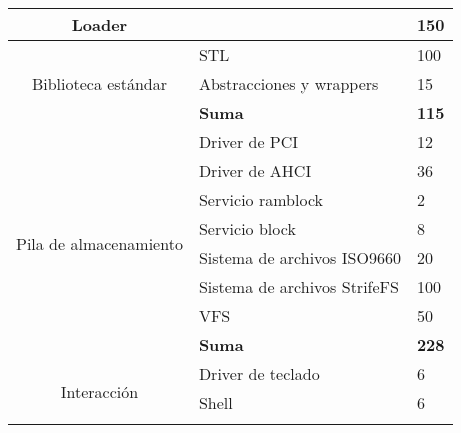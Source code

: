 \begin{table}[]
\begin{tabular}{|c|l|l|}
Loader                                  &                                                 & \textbf{150}                                  \\ \hline
\multirow{3}{*}{Biblioteca estándar}    & STL                                             & 100                                           \\ \cline{2-3} 
                                        & Abstracciones y wrappers                        & 15                                            \\ \cline{2-3} 
                                        & \textbf{Suma}                                   & \textbf{115}                                  \\ \hline
\multirow{8}{*}{Pila de almacenamiento} & Driver de PCI                                   & 12                                            \\ \cline{2-3} 
                                        & Driver de AHCI                                  & 36                                            \\ \cline{2-3} 
                                        & Servicio ramblock                               & 2                                             \\ \cline{2-3} 
                                        & Servicio block                                  & 8                                             \\ \cline{2-3} 
                                        & Sistema de archivos ISO9660                     & 20                                            \\ \cline{2-3} 
                                        & Sistema de archivos StrifeFS                    & 100                                           \\ \cline{2-3} 
                                        & VFS                                             & 50                                            \\ \cline{2-3} 
                                        & \textbf{Suma}                                   & \textbf{228}                                  \\ \hline
\multirow{4}{*}{Interacción}            & Driver de teclado                               & 6                                             \\ \cline{2-3} 
                                        & Shell                                           & 6                                             \\ \cline{2-3} 

\end{tabular}
\end{table}
